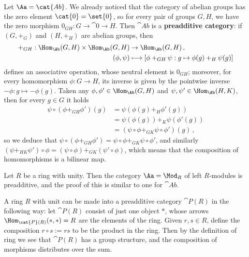 \begin{ex}
    Let $\Aa = \cat{Ab}$. We already noticed that the category
    of abelian groups has the zero element $\cat{0} = \set{0}$,
    so for every pair of groups $G,H$, we have the zero morphism
    $0_{GH}:G \to \cat{0} \to H$.
    Then $\cat{Ab}$ is a \textbf{preadditive category}:
    if $(G, +_{G})$ and $(H,+_{H})$ are abelian groups, then
    \begin{align*}
        +_{GH} : \Hom_{\Ab}(G,H) \times \Hom_{\Ab}(G,H) &\to \Hom_{\Ab}(G,H)\,,\\
        (\phi,\psi) &\longmapsto [\phi +_{GH} \psi : g \mapsto \phi(g) +_{H} \psi(g)]
    \end{align*}
    defines an associative operation, whose neutral element is $0_{GH}$;
    moreover, for every homomorphism $\phi:G \to H$, its inverse is 
    given by the pointwise inverse $-\phi : g \longmapsto -\phi(g)$. 
    Taken any $\phi,\phi' \in \Hom_{\Ab}(G,H)$
    and $\psi, \psi' \in \Hom_{\Ab}(H,K)$, then for every $g \in G$ it holds
    \begin{align*}
        \psi \circ (\phi +_{GH} \phi')(g) &= \psi(\phi(g) +_{H} \phi'(g)) \\
        &= \psi(\phi(g)) +_{K} \psi(\phi'(g)) \\
        &= (\psi \circ \phi +_{GK} \psi \circ \phi')(g)\,,
    \end{align*}
    so we deduce that $\psi \circ (\phi +_{GH} \phi') = \psi \circ \phi +_{GK} \psi \circ \phi'$, and similarly $(\psi +_{HK} \psi') \circ \phi = (\psi \circ \phi) +_{GK} (\psi' \circ \phi)$, which means that the composition of
    homomorphisms is a bilinear map.
\end{ex}

\begin{ex}
    Let $R$ be a ring with unity. Then the category $\Aa = \Mod_{R}$ 
    of left $R$-modules is preadditive, and the proof
    of this is similar to one for $\cat{Ab}$.
\end{ex}

\begin{ex!}\label{ring-cat}
    A ring $R$ with unit can be made into a preadditive
    category $\cat{P}(R)$ in the following way:
    let $\cat{P}(R)$ consist of just one object $\ast$,
    whose arrows $\Hom_{\cat{P}(R)}(\ast, \ast) = R$
    are the elements of the ring. Given $r,s \in R$,
    define the composition $r \circ s := rs$ to be the product
    in the ring. Then by the definition of ring we see
    that $\cat{P}(R)$ has a group structure,
    and the composition of morphisms distributes
    over the sum.
\end{ex!}

